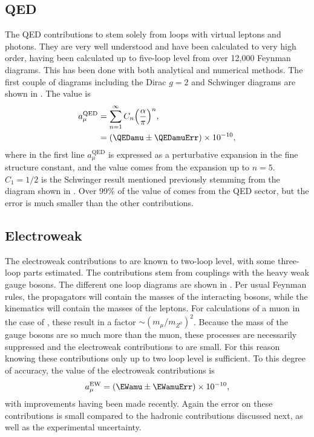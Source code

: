 \subsection{QED}
\label{subsec:QED}

The QED contributions to \amu stem solely from loops with virtual leptons and photons. They are very well understood and have been calculated to very high order, having been calculated up to five-loop level from over 12,000 Feynman diagrams. This has been done with both analytical and numerical methods. The first couple of diagrams including the Dirac $g = 2$ and Schwinger diagrams are shown in . The value is \cite{Kinoshita1,Kinoshita2}
		\begin{equation}
		\begin{aligned}
            a_{\mu}^{\text{QED}} &= \sum_{n=1}^{\infty} C_{n} \Big( \frac{\alpha}{\pi} \Big)^{n}, \\
            					 &= (\QEDamu \pm \QEDamuErr) \times 10^{-10},
		\end{aligned}
		\end{equation}
where in the first line $a_{\mu}^{\text{QED}}$ is expressed as a perturbative expansion in the fine structure constant, and the value comes from the expansion up to $n=5$. $C_{1} = 1/2$ is the Schwinger result mentioned previously stemming from the diagram shown in . Over 99\% of the value of \amu comes from the QED sector, but the error is much smaller than the other contributions.


\subsection{Electroweak}
\label{subsec:Electroweak}

The electroweak contributions to \amu are known to two-loop level, with some three-loop parts estimated. The contributions stem from couplings with the heavy weak gauge bosons. The different one loop diagrams are shown in . Per usual Feynman rules, the propagators will contain the masses of the interacting bosons, while the kinematics will contain the masses of the leptons. For calculations of a muon in the case of , these result in a factor $\sim(m_{\mu}/m_{Z^{0}})^{2}$. Because the mass of the gauge bosons are so much more than the muon, these processes are necessarily suppressed and the electroweak contributions to \amu are small. For this reason knowing these contributions only up to two loop level is sufficient. To this degree of accuracy, the value of the electroweak contributions is \cite{EW1,EW2}
		\begin{align}
            a_{\mu}^{\text{EW}} = (\EWamu \pm \EWamuErr) \times 10^{-10},
		\end{align}
with improvements having been made recently. Again the error on these contributions is small compared to the hadronic contributions discussed next, as well as the experimental uncertainty.



